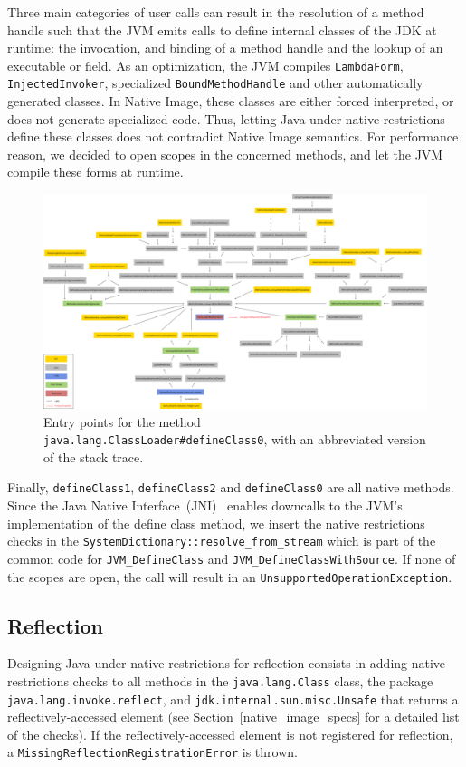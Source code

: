Three main categories of user calls can result in the resolution of a method handle such that the JVM emits calls to define internal classes of the JDK at runtime: the invocation, and binding of a method handle and the lookup of an executable or field. As an optimization, the JVM compiles \verb|LambdaForm|, \verb|InjectedInvoker|, specialized \verb|BoundMethodHandle| and other automatically generated classes. 
In Native Image, these classes are either forced interpreted, or does not generate specialized code. Thus, letting Java under native restrictions define these classes does not contradict Native Image semantics. For performance reason, we decided to open scopes in the concerned methods, and let the JVM compile these forms at runtime.

\begin{figure}
    \centering
    \includegraphics[angle=90,origin=c,scale=0.26]{resources/Group 401.png}
    \caption{Entry points for the method \texttt{java.lang.ClassLoader\#defineClass0}, with an abbreviated version of the stack trace.}
    \label{fig:define_class_0}
\end{figure}

Finally, \verb|defineClass1|, \verb|defineClass2| and \verb|defineClass0| are all native methods. Since the Java Native Interface~(JNI)~\cite{noauthor_jni_nodate} enables downcalls to the JVM's implementation of the define class method, we insert the native restrictions checks in the \verb|SystemDictionary::resolve_from_stream| which is part of the common code for \verb|JVM_DefineClass| and \verb|JVM_DefineClassWithSource|. If none of the scopes are open, the call will result in an \verb|UnsupportedOperationException|. 

\subsection{Reflection}
Designing Java under native restrictions for reflection consists in adding native restrictions checks to all methods in the \verb|java.lang.Class| class, the package \verb|java.lang.invoke.reflect|, and \verb|jdk.internal.sun.misc.Unsafe| that returns a reflectively-accessed element (see Section~\ref{native_image_specs} for a detailed list of the checks). 
If the reflectively-accessed element is not registered for reflection, a \verb|MissingReflectionRegistrationError| is thrown.

